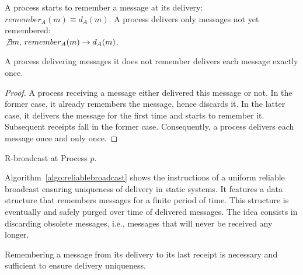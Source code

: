 \begin{definition}[Remembering]
  A process starts to remember a message at its delivery:
  $remember_A(m) \equiv d_A(m)$.  A process delivers only messages not yet
  remembered: \\ $\not\exists m,\, remember_A(m) \rightarrow d_A(m)$.
\end{definition}

\begin{theorem}
  A process delivering messages it does not remember delivers each message
  exactly once.
\end{theorem}

\begin{proof}
  A process receiving a message either delivered this message or not. In the
  former case, it already remembers the message, hence discards it. In the
  latter case, it delivers the message for the first time and starts to remember
  it. Subsequent receipts fall in the former case. Consequently, a process
  delivers each message once and only once.
\end{proof}


\begin{algorithm}[h]
  
  \caption{\label{algo:reliablebroadcast}R-broadcast at Process $p$.}
\end{algorithm}

Algorithm~\ref{algo:reliablebroadcast} shows the instructions of a uniform
reliable broadcast ensuring uniqueness of delivery in static systems. It
features a data structure that remembers messages for a finite period of time.
This structure is eventually and safely purged over time of delivered messages.
The idea consists in discarding obsolete messages, i.e., messages that will
never be received any longer.

\begin{theorem}
  Remembering a message from its delivery to its last receipt is necessary
  and sufficient to ensure delivery uniqueness.
\end{theorem}

